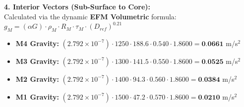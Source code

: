 \documentclass[11pt, a4paper]{article}
\begin{document}
  \vspace{0.5em}
  \noindent \textbf{4. Interior Vectors (Sub-Surface to Core):} \\[0.5em]
  \hspace*{1em} Calculated via the dynamic \textbf{EFM Volumetric} formula: $g_M = (\alpha G) \cdot \rho_{M} \cdot R_M \cdot \tau_M \cdot (D_{ref})^{0.21}$
  \begin{itemize}
    \item \textbf{M4 Gravity:} $(2.792 \times 10^{-7}) \cdot 1250 \cdot 188.6 \cdot 0.540 \cdot 1.8600 = \textbf{0.0661}$ m/s$^2$
    \item \textbf{M3 Gravity:} $(2.792 \times 10^{-7}) \cdot 1300 \cdot 141.5 \cdot 0.550 \cdot 1.8600 = \textbf{0.0525}$ m/s$^2$
    \item \textbf{M2 Gravity:} $(2.792 \times 10^{-7}) \cdot 1400 \cdot 94.3 \cdot 0.560 \cdot 1.8600 = \textbf{0.0384}$ m/s$^2$
    \item \textbf{M1 Gravity:} $(2.792 \times 10^{-7}) \cdot 1500 \cdot 47.2 \cdot 0.570 \cdot 1.8600 = \textbf{0.0210}$ m/s$^2$
  \end{itemize}
\end{document}
